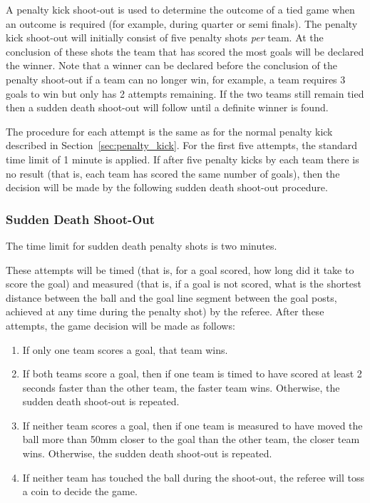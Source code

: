 \documentclass[12pt]{article}
\begin{document}
A penalty kick shoot-out is used to determine the outcome of a tied
game when an outcome is required (for example, during quarter or semi finals).
The penalty kick shoot-out will initially consist of five
penalty shots \emph{per} team. At the conclusion of these shots the
team that has scored the most goals will be declared the winner. Note
that a winner can be declared before the conclusion of the penalty
shoot-out if a team can no longer win, for example, a team requires 3 goals
to win but only has 2 attempts remaining. If the two teams still
remain tied then a sudden death shoot-out will follow until a
definite winner is found.

The procedure for each attempt is the same as for the normal penalty
kick described in Section~\ref{sec:penalty_kick}. For the first five
attempts, the standard time limit of 1 minute is applied. If after five penalty kicks by each team
there is no result (that is, each team has scored the same number of goals), then the decision will be made by the following sudden death shoot-out procedure.

\subsubsection{Sudden Death Shoot-Out}

The time limit for sudden death penalty shots is two minutes.

These attempts will be timed (that is, for a goal scored, how long did it take to score the goal) and measured (that is, if a goal is not scored, what is the shortest distance between the ball and the goal line segment between the goal posts, achieved at any time during the penalty shot) by the referee. After these attempts, the game decision will be made as follows:
\begin{enumerate}
  \item {If only one team scores a goal, that team wins.}
  \item {If both teams score a goal, then if one team is timed to have scored at least 2 seconds faster than the other team, the faster team wins. Otherwise, the sudden death shoot-out is repeated.}
  \item {If neither team scores a goal, then if one team is measured to have moved the ball more than 50mm closer to the goal than the other team, the closer team wins. Otherwise, the sudden death shoot-out is repeated.}
  \item {If neither team has touched the ball during the shoot-out, the referee will toss a coin to decide the game.}
\end{enumerate}
\end{document}
